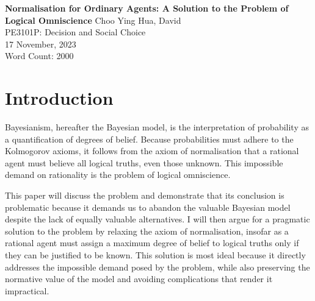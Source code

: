 \documentclass[12pt]{article}
\renewcommand{\maketitle}{%
    \begin{titlepage}
        \begin{center}
            \vfill
            \vspace*{\baselineskip}
            \vfill
            \textbf{Normalisation for Ordinary Agents: A Solution to the Problem of Logical Omniscience}
            \vfill
            Choo Ying Hua, David\\
            PE3101P: Decision and Social Choice\\
            17 November, 2023\\
            Word Count: 2000
            \vfill
        \end{center}
    \end{titlepage}
    }
\begin{document}
\maketitle
\section{Introduction}
Bayesianism, hereafter the Bayesian model, is the interpretation of probability as a quantification of degrees of belief. Because probabilities must adhere to the Kolmogorov axioms, it follows from the axiom of normalisation that a rational agent must believe all logical truths, even those unknown. This impossible demand on rationality is the problem of logical omniscience.

This paper will discuss the problem and demonstrate that its conclusion is problematic because it demands us to abandon the valuable Bayesian model despite the lack of equally valuable alternatives. I will then argue for a pragmatic solution to the problem by relaxing the axiom of normalisation, insofar as a rational agent must assign a maximum degree of belief to logical truths only if they can be justified to be known. This solution is most ideal because it directly addresses the impossible demand posed by the problem, while also preserving the normative value of the model and avoiding complications that render it impractical.
\end{document}
